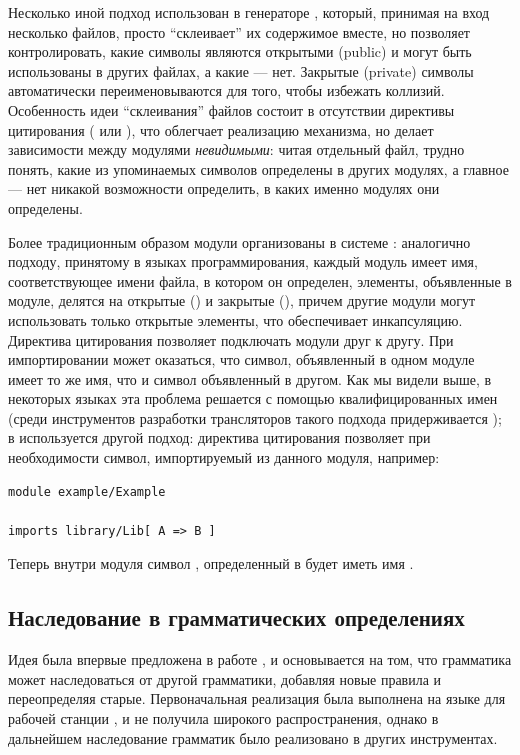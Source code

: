 Несколько иной подход использован в генераторе  \cite{Menhir}, который, принимая на вход несколько файлов, просто ``склеивает'' их содержимое вместе, но позволяет контролировать, какие символы являются открытыми (public) и могут быть использованы в других файлах, а какие --- нет. Закрытые (private) символы автоматически переименовываются для того, чтобы избежать коллизий. Особенность идеи ``склеивания'' файлов состоит в отсутствии директивы цитирования ( или ), что облегчает реализацию механизма, но делает зависимости между модулями \emph{невидимыми}: читая отдельный файл, трудно понять, какие из упоминаемых символов определены в других модулях, а главное --- нет никакой возможности определить, в каких именно модулях они определены.

Более традиционным образом модули организованы в системе  \cite{ASF+SDF}: аналогично подходу, принятому в языках программирования, каждый модуль имеет имя, соответствующее имени файла, в котором он определен, элементы, объявленные в модуле, делятся на открытые () и закрытые (), причем другие модули могут использовать только открытые элементы, что обеспечивает инкапсуляцию. Директива цитирования  позволяет подключать модули друг к другу. При импортировании может оказаться, что символ, объявленный в одном модуле имеет то же имя, что и символ объявленный в другом. Как мы видели выше, в некоторых языках эта проблема решается с помощью квалифицированных имен (среди инструментов разработки трансляторов такого подхода придерживается  \cite{Rats!}); в  используется другой подход: директива цитирования позволяет при необходимости  символ, импортируемый из данного модуля, например:

\begin{lstlisting}
module example/Example

imports library/Lib[ A => B ]
\end{lstlisting}

Теперь внутри модуля  символ , определенный в  будет иметь имя .

\subsection{Наследование в грамматических определениях}
Идея  была впервые предложена в работе \cite{GInh}, и основывается на том, что грамматика может наследоваться от другой грамматики, добавляя новые правила и переопределяя старые. Первоначальная реализация была выполнена на языке  для рабочей станции , и не получила широкого распространения, однако в дальнейшем наследование грамматик было реализовано в других инструментах.

